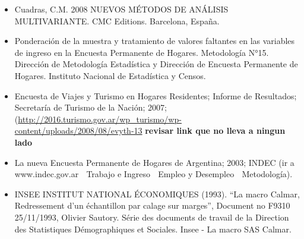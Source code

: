 \documentclass[
  openany]{book}
\begin{document}
\begin{itemize}
\item
  Cuadras, C.M. 2008 NUEVOS MÉTODOS DE ANÁLISIS MULTIVARIANTE. CMC
  Editions. Barcelona, España.
\item
  Ponderación de la muestra y tratamiento de valores faltantes en las
  variables de ingreso en la Encuesta Permanente de Hogares.
  Metodología N°15. Dirección de Metodología Estadística y Dirección
  de Encuesta Permanente de Hogares. Instituto Nacional de Estadística
  y Censos.
\item
  Encuesta de Viajes y Turismo en Hogares Residentes; Informe de
  Resultados; Secretaría de Turismo de la Nación; 2007;
  (\href{http://2016.turismo.gov.ar/wp_turismo/wp-content/uploads/2008/08/evyth-13-08.pdf}{http://2016.turismo.gov.ar/wp\_turismo/wp-content/uploads/2008/08/evyth-13} \textbf{revisar link que no lleva a ningun lado}
\item
  La nueva Encuesta Permanente de Hogares de Argentina; 2003; INDEC
  (ir a www.indec.gov.ar  Trabajo e Ingreso  Empleo y Desempleo 
  Metodología).
\item
  INSEE INSTITUT NATIONAL ÉCONOMIQUES (1993). ``La macro Calmar,
  Redressement d'un échantillon par calage sur marges'', Document no
  F9310 25/11/1993, Olivier Sautory. Série des documents de travail de
  la Direction des Statistiques Démographiques et Sociales. Insee - La
  macro SAS Calmar.
\end{itemize}

  
\end{document}
